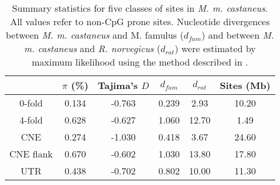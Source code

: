 \begin{table}[H]
\centering
\caption[Summary statistics for multiple classes of sites]{Summary statistics for five classes of sites in \textit{M. m. castaneus}. All values refer to non-CpG prone sites. Nucleotide divergences between \textit{M. m. castaneus} and M. famulus ($d_{fam}$) and between \textit{M. m. castaneus} and \textit{R. norvegicus} ($d_{rat}$) were estimated by maximum likelihood using the method described in \cite{RN321}. }
\begin{tabular}{cccccc}
\toprule
           &  $\pi$ (\%)  &  Tajima's $D$ &  $d_{fam}$  &  $d_{rat}$  &  Sites (Mb) \\
\midrule
    0-fold &    0.134 &     -0.763 &   0.239 &    2.93 &       10.20 \\
    4-fold &    0.628 &     -0.627 &   1.060 &   12.70 &        1.49 \\
       CNE &    0.274 &     -1.030 &   0.418 &    3.67 &       24.60 \\
 CNE flank &    0.670 &     -0.602 &   1.030 &   13.80 &       17.80 \\
       UTR &    0.438 &     -0.702 &   0.802 &   10.00 &       11.30 \\
\bottomrule
\end{tabular}
\label{tab:CastSummaryStats}
\end{table}